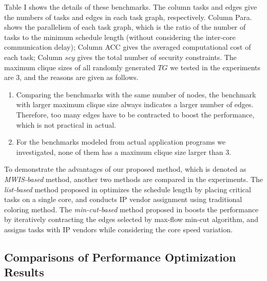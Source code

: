 \documentclass[10pt,journal]{IEEEtran}
\begin{document}
Table I shows the details of these benchmarks. The column tasks and edges give the numbers of tasks and edges in each task graph, respectively. Column Para. shows the parallelism of each task graph, which is the ratio of the number of tasks to the minimum schedule length (without considering the inter-core communication delay); Column ACC gives the averaged computational cost of each task; Column $scy$ gives the total number of security constraints. The maximum clique sizes of all randomly generated $TG$ we tested in the experiments are 3, and the reasons are given as follows.
\begin{enumerate}
\item Comparing the benchmarks with the same number of nodes, the benchmark with larger maximum clique size always indicates a larger number of edges. Therefore, too many edges have to be contracted to boost the performance, which is not practical in actual.
\item For the benchmarks modeled from actual application programs we investigated, none of them has a maximum clique size larger than 3.
\end{enumerate}



To demonstrate the advantages of our proposed method, which is denoted as \textit{MWIS-based} method, another two methods are compared in the experiments. The \textit{list-based} method proposed in \cite{article:CL} optimizes the schedule length by placing critical tasks on a single core, and conducts IP vendor assignment using traditional coloring method. The \textit{min-cut-based} method proposed in \cite{article:NW} boosts the performance by iteratively contracting the edges selected by max-flow min-cut algorithm, and assigns tasks with IP vendors while considering the core speed variation.



\subsection{Comparisons of Performance Optimization Results}






\end{document}
